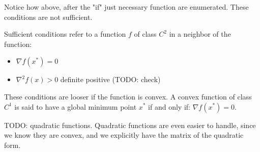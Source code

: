 Notice how above, after the "if" just necessary function are enumerated. These conditions are not sufficient.

Sufficient conditions refer to a function $f$ of class $C^2$ in a neighbor of the function:
\begin{itemize}
  \item $\nabla f(x^*) = 0$
  \item $\nabla^2 f(x) > 0$ definite positive (TODO: check)
\end{itemize}

These conditions are looser if the function is convex. A convex function of class $C^1$ is said to have a global minimum point $x^*$ if and only if: $\nabla f(x^*) = 0$.

TODO: quadratic functions. Quadratic functions are even easier to handle, since we know they are convex, and we explicitly have the matrix of the quadratic form.

